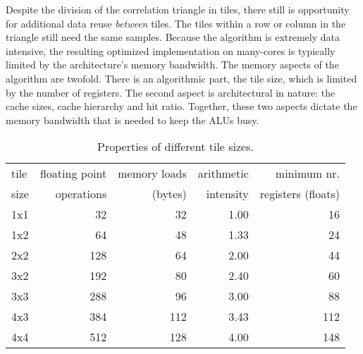 \documentclass{article}
\begin{document}
Despite the division of the correlation triangle in tiles, there
still is opportunity for additional data reuse \emph{between} tiles. 
The tiles
within a row or column in the triangle still need the same samples.
Because the algorithm is
extremely data intensive, the resulting optimized implementation on
many-cores is typically limited by the architecture's memory
bandwidth. The memory aspects of the algorithm are twofold.
There is an algorithmic part, the tile size, which is limited
by the number of registers. The second aspect is architectural in nature: the cache
sizes, cache hierarchy and hit ratio. Together, these two aspects dictate the
memory bandwidth that is needed to keep the ALUs busy.

\begin{table}
\begin{center}
{\small
\begin{tabular}{l|r|r|r|r}
tile & floating point & memory loads & arithmetic     &  minimum nr.           \\
size & operations     & (bytes)      & intensity      &  registers (floats)    \\
\hline
1x1  &  32            &   32         &   1.00         &  16                    \\
1x2  &  64            &   48         &   1.33         &  24                    \\
2x2  & 128            &   64         &   2.00         &  44                    \\
3x2  & 192            &   80         &   2.40         &  60                    \\
3x3  & 288            &   96         &   3.00         &  88                    \\
4x3  & 384            &  112         &   3.43         & 112                    \\
4x4  & 512            &  128         &   4.00         & 148                    \\
\end{tabular}
} %
\end{center}
\vspace{-0.5cm}
\caption{Properties of different tile sizes.}
\label{tile-size-table}
\end{table}
\end{document}
